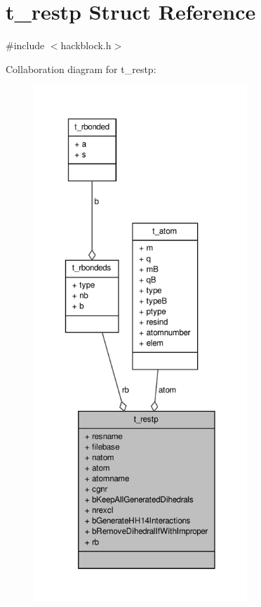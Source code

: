 \hypertarget{structt__restp}{\section{t\-\_\-restp \-Struct \-Reference}
\label{structt__restp}
}


{\ttfamily \#include $<$hackblock.\-h$>$}



\-Collaboration diagram for t\-\_\-restp\-:
\nopagebreak
\begin{figure}[H]
\begin{center}
\leavevmode
\includegraphics[height=550pt]{structt__restp__coll__graph}
\end{center}
\end{figure}
